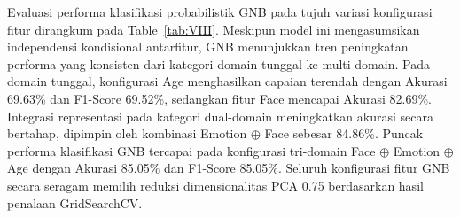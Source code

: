 Evaluasi performa klasifikasi probabilistik GNB pada tujuh variasi konfigurasi fitur dirangkum pada Table~\ref{tab:VIII}. Meskipun model ini mengasumsikan independensi kondisional antarfitur, GNB menunjukkan tren peningkatan performa yang konsisten dari kategori domain tunggal ke multi-domain. Pada domain tunggal, konfigurasi Age menghasilkan capaian terendah dengan Akurasi 69.63\% dan F1-Score 69.52\%, sedangkan fitur Face mencapai Akurasi 82.69\%. Integrasi representasi pada kategori dual-domain meningkatkan akurasi secara bertahap, dipimpin oleh kombinasi Emotion $\oplus$ Face sebesar 84.86\%. Puncak performa klasifikasi GNB tercapai pada konfigurasi tri-domain Face $\oplus$ Emotion $\oplus$ Age dengan Akurasi 85.05\% dan F1-Score 85.05\%. Seluruh konfigurasi fitur GNB secara seragam memilih reduksi dimensionalitas PCA 0.75 berdasarkan hasil penalaan GridSearchCV.

